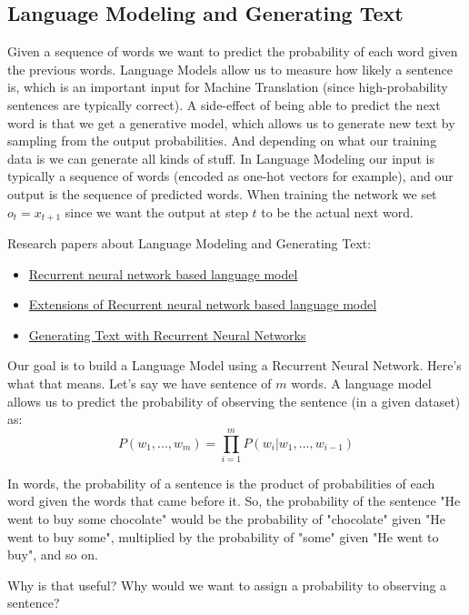 \documentclass[UTF8,10pt,a4paper]{ctexbook}
\begin{document}
\subsection{Language Modeling and Generating Text}
Given a sequence of words we want to predict the probability of each word given the previous words. Language Models allow us to measure how likely a sentence is, which is an important input for Machine Translation (since high-probability sentences are typically correct). A side-effect of being able to predict the next word is that we get a generative model, which allows us to generate new text by sampling from the output probabilities. And depending on what our training data is we can generate all kinds of stuff. In Language Modeling our input is typically a sequence of words (encoded as one-hot vectors for example), and our output is the sequence of predicted words. When training the network we set $o_{t} = x_{t+1}$ since we want the output at step $t$ to be the actual next word.

Research papers about Language Modeling and Generating Text:
\begin{itemize}
\item \href{http://www.fit.vutbr.cz/research/groups/speech/publi/2010/mikolov_interspeech2010_IS100722.pdf}{Recurrent neural network based language model}
\item \href{http://www.fit.vutbr.cz/research/groups/speech/publi/2011/mikolov_icassp2011_5528.pdf}{Extensions of Recurrent neural network based language model}
\item \href{http://machinelearning.wustl.edu/mlpapers/paper_files/ICML2011Sutskever_524.pdf}{Generating Text with Recurrent Neural Networks}
\end{itemize}


Our goal is to build a Language Model using a Recurrent Neural Network. Here's what that means. Let's say we have sentence of $m$ words. A language model allows us to predict the probability of observing the sentence (in a given dataset) as:
\[
P(w_{1}, ..., w_{m})=\prod_{i=1}^{m}{P(w_{i}|w_{1},...,w_{i-1})}
\]

In words, the probability of a sentence is the product of probabilities of each word given the words that came before it. So, the probability of the sentence "He went to buy some chocolate" would be the probability of "chocolate" given "He went to buy some", multiplied by the probability of "some" given "He went to buy", and so on.

Why is that useful? Why would we want to assign a probability to observing a sentence?
\end{document}

